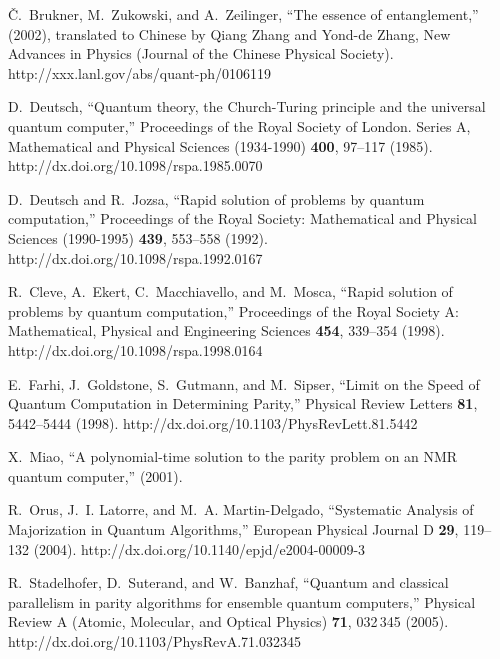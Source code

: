 \documentclass{article}
\begin{document}
\begin{thebibliography}{10}
{\v{C}}.~Brukner, M.~Zukowski, and A.~Zeilinger, \enquote{The essence of
  entanglement,}  (2002), translated to Chinese by Qiang Zhang and Yond-de
  Zhang, New Advances in Physics (Journal of the Chinese Physical Society).
\newline http://xxx.lanl.gov/abs/quant-ph/0106119

D.~Deutsch, \enquote{Quantum theory, the {C}hurch-{T}uring principle and the
  universal quantum computer,} Proceedings of the Royal Society of London.
  Series A, Mathematical and Physical Sciences (1934-1990) {\bf 400}, 97--117
  (1985).
\newline http://dx.doi.org/10.1098/rspa.1985.0070

D.~Deutsch and R.~Jozsa, \enquote{Rapid solution of problems by quantum
  computation,} Proceedings of the Royal Society: Mathematical and Physical
  Sciences (1990-1995) {\bf 439}, 553--558 (1992).
\newline http://dx.doi.org/10.1098/rspa.1992.0167

R.~Cleve, A.~Ekert, C.~Macchiavello, and M.~Mosca, \enquote{Rapid solution of
  problems by quantum computation,} Proceedings of the Royal Society A:
  Mathematical, Physical and Engineering Sciences {\bf 454}, 339--354 (1998).
\newline http://dx.doi.org/10.1098/rspa.1998.0164

E.~Farhi, J.~Goldstone, S.~Gutmann, and M.~Sipser, \enquote{Limit on the Speed
  of Quantum Computation in Determining Parity,} Physical Review Letters {\bf
  81}, 5442--5444 (1998).
\newline http://dx.doi.org/10.1103/PhysRevLett.81.5442

X.~Miao, \enquote{A polynomial-time solution to the parity problem on an {NMR}
  quantum computer,}  (2001).

R.~Orus, J.~I. Latorre, and M.~A. Martin-Delgado, \enquote{Systematic Analysis
  of Majorization in Quantum Algorithms,} European Physical Journal D {\bf 29},
  119--132 (2004).
\newline http://dx.doi.org/10.1140/epjd/e2004-00009-3

R.~Stadelhofer, D.~Suterand, and W.~Banzhaf, \enquote{Quantum and classical
  parallelism in parity algorithms for ensemble quantum computers,} Physical
  Review A (Atomic, Molecular, and Optical Physics) {\bf 71}, 032\,345 (2005).
\newline http://dx.doi.org/10.1103/PhysRevA.71.032345

\end{thebibliography}
\end{document}
